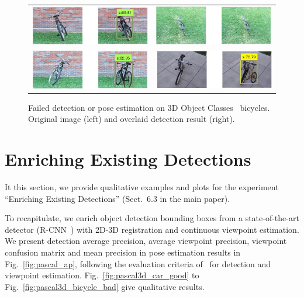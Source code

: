 \documentclass[10pt,twocolumn,letterpaper]{article}
\begin{document}
\begin{figure}[h]
\setlength\tabcolsep{1pt}
\centering
\begin{tabular}{|c|c|}
\hline 
  \includegraphics[width=0.40\linewidth]{supp/bicycle1.png} &
  \includegraphics[width=0.40\linewidth]{supp/bicycle5.png} \\
  \includegraphics[width=0.40\linewidth]{supp/bicycle19.png} &
  \includegraphics[width=0.40\linewidth]{supp/bicycle20.png} \\
\hline
\end{tabular}
\caption{Failed detection or pose estimation on 3D Object
  Classes~\cite{savarese07} bicycles. Original image (left) and overlaid
  detection result (right).}
  \label{fig:3dobject_bicycle_bad}
\end{figure}

\section{Enriching Existing Detections}
%
It this section, we provide qualitative examples and plots for the experiment
``Enriching Existing Detections'' (Sect.~6.3 in the main paper).

To recapitulate, we enrich object detection bounding boxes from
a state-of-the-art detector (R-CNN~\cite{Girshick14}) with 2D-3D
registration and continuous viewpoint estimation. We present detection
average precision, average viewpoint precision, viewpoint confusion
matrix and mean precision in pose estimation results in
Fig.~\ref{fig:pascal_ap}, following the evaluation criteria
of~\cite{Xiang14} for detection and viewpoint
estimation. Fig.~\ref{fig:pascal3d_car_good} to
Fig.~\ref{fig:pascal3d_bicycle_bad} give qualitative results.
%
\end{document}
